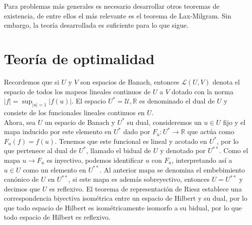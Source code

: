 \documentclass{article}
\begin{document}
\noindent
Para problemas más generales es necesario desarrollar otros teoremas de existencia, de entre ellos el más relevante es el teorema de Lax-Milgram. Sin embargo, la teoría desarrollada es suficiente para lo que sigue.
\section{Teoría de optimalidad}
Recordemos que si $U$ y $V$ son espacios de Banach, entonces $\mathcal{L}(U,V)$ denota el espacio de todos los mapeos lineales continuos de $U$ a $V$ dotado con la norma $|f|=\sup_{|u|=1}|f(u)|$. El espacio $U^{*}=\mathcal{U,\mathbb{R}}$ es denominado el dual de $U$ y consiste de los funcionales lineales continuos en $U$.\\

\noindent
Ahora, sea $U$ un espacio de Banach y $U^{*}$ su dual, consideremos un $u\in U$ fijo  y el mapa inducido por este elemento en $U^{*}$ dado por $F_u:U^{*}\to \mathbb{R}$ que actúa como $F_u(f)=f(u)$. Tenemos que este funcional es lineal y acotado en $U^{*}$, por lo que pertenece al dual de $U^{*}$, llamado el bidual de $U$ y denotado por $U^{**}$. Como el mapa $u\to F_u$ es inyectivo, podemos identificar $u$ con $F_u$, interpretando así a $u\in U$ como un elemento en $U^{**}$. Al anterior mapa se denomina el embebimiento canónico de $U$ en $U^{**}$, si este mapa es además sobreyectivo, entonces $U=U^{**}$ y decimos que $U$  es reflexivo. El teorema de representación de Riesz establece una correspondencia biyectiva isométrica entre un espacio de Hilbert y su dual, por lo que todo espacio de Hilbert es isométricamente isomorfo a su bidual, por lo que todo espacio de Hilbert es reflexivo.\\
\end{document}
